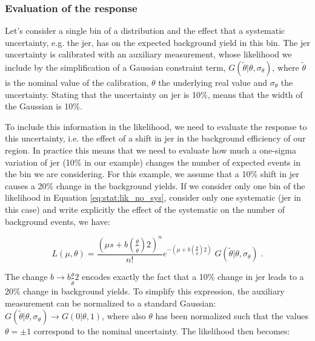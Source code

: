 \subsubsection*{Evaluation of the response}

Let’s consider a single bin of a distribution and the effect that a systematic uncertainty, 
e.g. the \gls{jer}, has on the expected background yield in this bin. 
The \gls{jer} uncertainty is calibrated with an auxiliary measurement, whose likelihood we include by the simplification of a Gaussian constraint term, $G( \tilde{\theta} | \theta, \sigma_\theta)$, where $\tilde{\theta}$ is the nominal value of the calibration, $\theta$ the underlying real value and $\sigma_\theta$ the uncertainty. Stating that the uncertainty on \gls{jer} is 10\%, means that the width of the Gaussian is 10\%. 

To include this information in the likelihood, we need to evaluate the response to this uncertainty, i.e. the effect of a shift in \gls{jer} in the background efficiency of our region.
In practice this means that we need to evaluate how much a one-sigma variation of \gls{jer} (10\% in our example) changes the number of expected events in the bin we are considering. 
For this example, we assume that a 10\% shift in \gls{jer} causes a 20\% change in the background yields.
If we consider only one bin of the likelihood in Equation \ref{eq:stat:lik_no_sys}, consider only one systematic (\gls{jer} in this case) and write explicitly the effect of the systematic on the number of background events, we have:

\begin{equation}
\label{eq:stat:lik_one_bin_sys_pre}
L(\mu, \theta) =
\frac{ (\mu s +
b \left( \frac{\theta}{\tilde{\theta}} \right) 2 )^{n} }{ n! }
e^{- (\mu  + b\left(\frac{\theta}{\tilde{\theta} }\right)2)}   \; 
G( \tilde{\theta} | \theta, \sigma_\theta) \; .
\end{equation}

\noindent The change $b \rightarrow b\frac{\theta}{\tilde{\theta} }2$ encodes exactly the fact that a 10\% change in \gls{jer} leads to a 20\% change in background yields. To simplify this expression, the auxiliary measurement can be normalized to a standard Gaussian: $G( \tilde{\theta} | \theta, \sigma_\theta) \rightarrow G( 0 | \theta, 1)$, where also $\theta$ has been normalized such that the values $\theta = \pm 1$ correspond to the nominal uncertainty. The likelihood then becomes:


